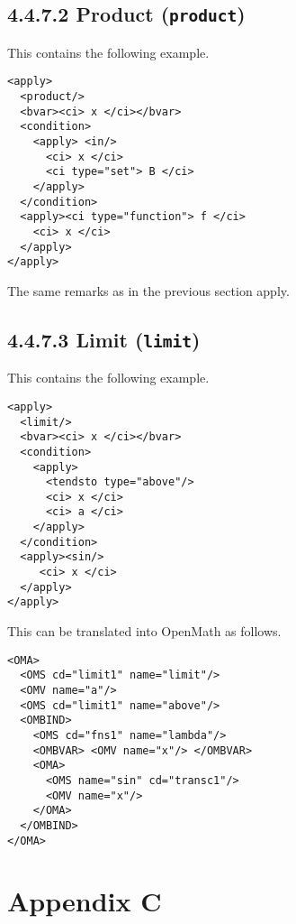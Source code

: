 \documentclass{llncs}
\begin{document}
{\subsection{4.4.7.2 Product ({\tt product}) }\label{4472}
This contains the following example.
\begin{lstlisting}[language=MathML2]
<apply>
  <product/>
  <bvar><ci> x </ci></bvar>
  <condition>
    <apply> <in/>
      <ci> x </ci>
      <ci type="set"> B </ci>
    </apply>
  </condition>
  <apply><ci type="function"> f </ci>
    <ci> x </ci>
  </apply>
</apply>
\end{lstlisting}
The same remarks as in the previous section apply.
\subsection{4.4.7.3 Limit ({\tt limit}) }\label{4473}
This contains the following example.
\begin{lstlisting}[language=MathML2]
<apply>
  <limit/>
  <bvar><ci> x </ci></bvar>
  <condition>
    <apply>
      <tendsto type="above"/>
      <ci> x </ci>
      <ci> a </ci>
    </apply>
  </condition>
  <apply><sin/>
     <ci> x </ci>
  </apply>
</apply>
\end{lstlisting}
This can be translated into OpenMath as follows.
\begin{lstlisting}
<OMA>
  <OMS cd="limit1" name="limit"/>
  <OMV name="a"/>
  <OMS cd="limit1" name="above"/>
  <OMBIND>
    <OMS cd="fns1" name="lambda"/>
    <OMBVAR> <OMV name="x"/> </OMBVAR>
    <OMA>
      <OMS name="sin" cd="transc1"/>
      <OMV name="x"/>
    </OMA>
  </OMBIND>
</OMA>
\end{lstlisting}
\section{Appendix C}
}
\end{document}
